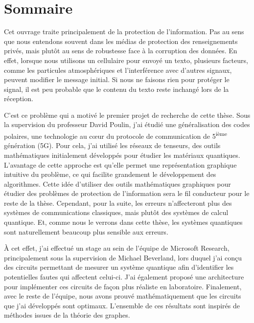 \begin{comment}
\end{comment}

\clearpage  %
\chapter*{Sommaire}

Cet ouvrage traite principalement de la protection de l'information. Pas au
sens que nous entendons souvent dans les médias de protection des renseignements privés, 
mais plutôt au sens de robustesse face à la corruption des données.
En effet, lorsque nous utilisons un cellulaire pour envoyé un texto, plusieurs
facteurs, comme les particules atmosphériques et l'interférence avec d'autres
signaux, peuvent modifier le message initial. Si nous ne faisons rien pour protéger le signal, 
il est peu probable que le contenu du texto reste inchangé lors de la réception.

C'est ce problème qui a motivé le premier projet de recherche de cette thèse.
Sous la supervision du professeur David Poulin, 
j'ai étudié une généralisation des codes polaires,
une technologie au cœur du protocole de communication de 5\textsuperscript{ième} génération (5G). 
Pour cela, j'ai utilisé les réseaux de tenseurs, des outils
mathématiques initialement développés pour étudier les matériaux quantiques.
L'avantage de cette approche est qu'elle permet une représentation graphique
intuitive du problème, ce qui facilite grandement le développement des algorithmes.
Cette idée d'utiliser des outils mathématiques graphiques pour étudier des
problèmes de protection de l'information sera le fil conducteur pour le reste de
la thèse. Cependant, pour la suite, les erreurs n'affecteront plus des systèmes
de communications classiques, mais plutôt des systèmes de calcul quantique.
Et, comme nous le verrons dans cette thèse, les systèmes quantiques sont
naturellement beaucoup plus sensible aux erreurs.

À cet effet, j'ai effectué un stage au sein de l'équipe de Microsoft Research,
principalement sous la supervision de Michael Beverland, lors duquel j'ai conçu
des circuits permettant de mesurer un système quantique afin d'identifier les
potentielles fautes qui affectent celui-ci. 
J'ai également proposé une architecture pour implémenter ces circuits de façon plus réaliste en laboratoire.
Finalement, avec le reste de l'équipe, nous avons prouvé mathématiquement
que les circuits que j'ai développés sont optimaux.
L'ensemble de ces résultats sont inspirés de méthodes issues de la théorie des graphes.

